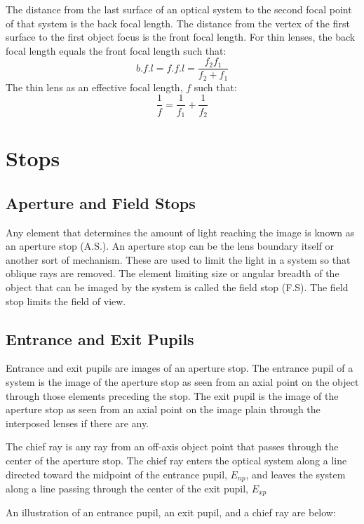 \documentclass[12pt]{report}
\begin{document}
The distance from the last surface of an optical system to the second focal point of that system is the back focal length. The distance from the vertex of the first surface to the first object focus is the front focal length. For thin lenses, the back focal length equals the front focal length such that:
\[b.f.l = f. f.l = \frac{f_2f_1}{f_2+f_1}\]
The thin lens as an effective focal length, $f$ such that:
\begin{equation}
\frac{1}{f} = \frac{1}{f_1}+\frac{1}{f_2}
\end{equation}

\section{Stops}
\subsection{Aperture and Field Stops}
Any element that determines the amount of light reaching the image is known as an aperture stop (A.S.). An aperture stop can be the lens boundary itself or another sort of mechanism. These are used to limit the light in a system so that oblique rays are removed. The element limiting size or angular breadth of the object that can be imaged by the system is called the field stop (F.S). The field stop limits the field of view.  
\subsection{Entrance and Exit Pupils}
Entrance and exit pupils are images of an aperture stop. The entrance pupil of a system is the image of the aperture stop as seen from an axial point on the object through those elements preceding the stop. The exit pupil is the image of the aperture stop as seen from an axial point on the image plain through the interposed lenses if there are any. 

The chief ray is any ray from an off-axis object point that passes through the center of the aperture stop. The chief ray enters the optical system along a line directed toward the midpoint of the entrance pupil, $E_{np}$, and leaves the system along a line passing through the center of the exit pupil, $E_{xp}$ 

An illustration of an entrance pupil, an exit pupil, and a chief ray are below:
\end{document}
